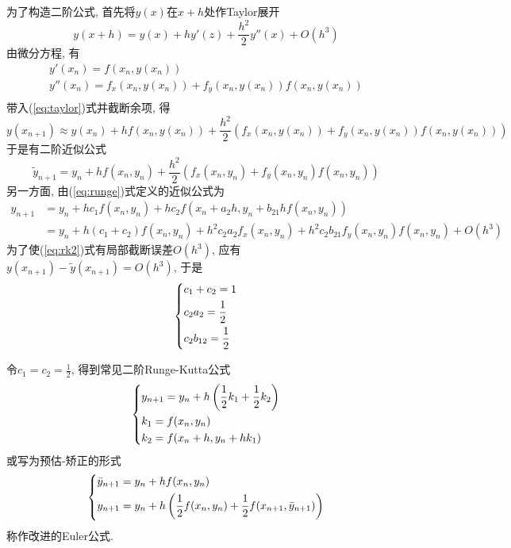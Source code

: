 \documentclass{nedsart}
\begin{document}
为了构造二阶公式, 首先将$y(x)$在$x+h$处作Taylor展开
\begin{equation}\label{eq:taylor}
    y(x+h) = y(x) + h y'(z) + \frac{h^2}{2} y''(x) + O(h^3)
\end{equation}
由微分方程, 有
\begin{equation}
    \begin{array}{l}
        y'(x_n) = f(x_n, y(x_n)) \\
        y''(x_n) = f_x(x_n, y(x_n)) + f_y(x_n, y(x_n))f(x_n, y(x_n)) \\
    \end{array}
\end{equation}
带入(\ref{eq:taylor})式并截断余项, 得
\begin{equation}
    y(x_{n+1}) \approx y(x_n) + h f(x_n, y(x_n)) + \frac{h^2}{2} \left(f_x(x_n, y(x_n)) + f_y(x_n, y(x_n))f(x_n, y(x_n))\right)
\end{equation}
于是有二阶近似公式
\begin{equation}\label{eq:rk1}
    \tilde{y}_{n+1} = y_n + h f(x_n, y_n) + \frac{h^2}{2} \left(f_x(x_n, y_n) + f_y(x_n, y_n)f(x_n, y_n)\right)
\end{equation}
另一方面, 由(\ref{eq:runge})式定义的近似公式为
\begin{equation}\label{eq:rk2}
    \begin{aligned}
        y_{n+1} & = y_n + h c_1 f(x_n, y_n) + h c_2 f(x_n + a_2 h, y_n + b_{21} h f(x_n, y_n)) \\
                & = y_n + h (c_1 + c_2) f(x_n, y_n) + h^2 c_2 a_2 f_x(x_n, y_n) + h^2 c_2 b_{21} f_y(x_n, y_n) f(x_n, y_n) + O(h^3)
    \end{aligned}
\end{equation}
为了使(\ref{eq:rk2})式有局部截断误差$O(h^3)$, 应有$y(x_{n+1}) - \tilde{y}(x_{n+1}) = O(h^3)$, 于是
\begin{equation}
    \begin{dcases}
        c_1 + c_2 = 1 \\
        c_2 a_2 = \frac{1}{2} \\
        c_2 b_{12} = \frac{1}{2}
    \end{dcases}
\end{equation}

令$c_1=c_2=\frac{1}{2}$, 得到常见二阶Runge-Kutta公式
\begin{equation}
    \begin{dcases}
        y_{n+1} = y_n + h \left(\frac{1}{2} k_1 + \frac{1}{2} k_2\right) \\
        k_1 = f(x_n, y_n) \\
        k_2 = f(x_n + h, y_n + h k_1)
    \end{dcases}
\end{equation}
或写为预估-矫正的形式
\begin{equation}\label{eq:euler1}
    \begin{dcases}
        \bar{y}_{n+1} = y_n + h f(x_n, y_n) \\
        y_{n+1} = y_n + h \left(\frac{1}{2} f(x_n, y_n) + \frac{1}{2} f(x_{n+1}, \bar{y}_{n+1})\right)
    \end{dcases}
\end{equation}
称作改进的Euler公式.
\end{document}
